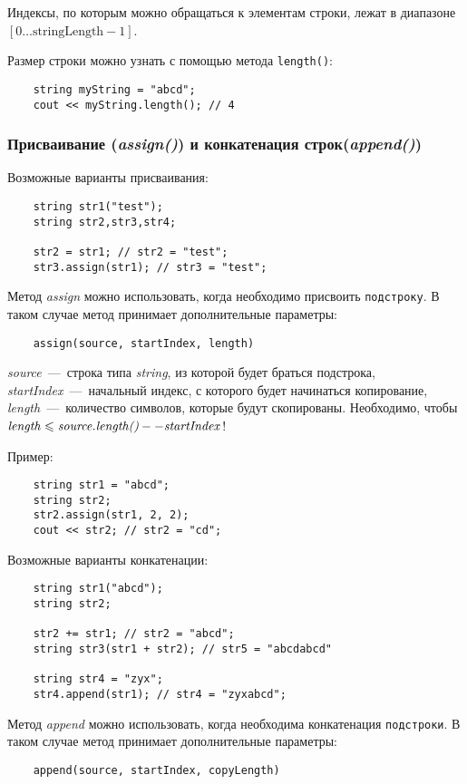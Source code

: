 Индексы, по которым можно обращаться к элементам строки,
лежат в диапазоне~$\left[ 0 \ldots \text{stringLength} - 1 \right]$.

Размер строки можно узнать с помощью метода \lstinline{length()}:
\begin{lstlisting}
    string myString = "abcd";
    cout << myString.length(); // 4
\end{lstlisting}

\subsubsection{Присваивание (\textit{assign()}) и конкатенация строк(\textit{append()})}

Возможные варианты присваивания:
\begin{lstlisting}
    string str1("test");
    string str2,str3,str4;

    str2 = str1; // str2 = "test";
    str3.assign(str1); // str3 = "test";
\end{lstlisting}

Метод \textit{assign} можно использовать, когда необходимо присвоить \texttt{подстроку}. В таком случае метод принимает дополнительные параметры:
\begin{lstlisting}
    assign(source, startIndex, length)
\end{lstlisting}
\textit{source}~---~строка типа \textit{string}, из которой будет браться подстрока, \textit{startIndex}~---~начальный индекс, с которого будет начинаться копирование, \textit{length}~---~количество символов, которые будут скопированы. Необходимо, чтобы $\text{\textit{length}} \leqslant \text{\textit{source.length()}} - - \text{\textit{startIndex}}$!

Пример:
\begin{lstlisting}
    string str1 = "abcd";
    string str2;
    str2.assign(str1, 2, 2); 
    cout << str2; // str2 = "cd";
\end{lstlisting}

Возможные варианты конкатенации:
\begin{lstlisting}
    string str1("abcd");
    string str2;

    str2 += str1; // str2 = "abcd";
    string str3(str1 + str2); // str5 = "abcdabcd"

    string str4 = "zyx";
    str4.append(str1); // str4 = "zyxabcd";
\end{lstlisting}

Метод \textit{append} можно использовать, когда необходима конкатенация \texttt{подстроки}. В таком случае метод принимает дополнительные параметры:
\begin{lstlisting}
    append(source, startIndex, copyLength)
\end{lstlisting}

